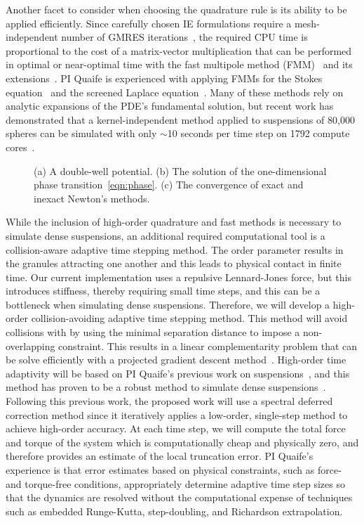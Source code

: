 Another facet to consider when choosing the quadrature rule is its
ability to be applied efficiently. Since carefully chosen IE
formulations require a mesh-independent number of GMRES
iterations~\cite{cam-ips-kel-mey-xue1996}, the required CPU time is
proportional to the cost of a matrix-vector multiplication that can be
performed in optimal or near-optimal time with the fast multipole method
(FMM)~\cite{fmm5} and its extensions~\cite{fmm1, fmm2, fmm3, fmm4, fmm6,
fmm7, ros-ols2016}. PI Quaife is experienced with applying FMMs for the
Stokes equation~\cite{qua-bir2014, bys-sha-qua2020} and the screened
Laplace equation~\cite{kro-qua2011, qua2011}. Many of these methods rely
on analytic expansions of the PDE's fundamental solution, but recent
work has demonstrated that a kernel-independent method applied to
suspensions of 80,000 spheres can be simulated with only $\sim$10
seconds per time step on 1792 compute cores~\cite{Yan2019}.

\begin{figure}
  \vspace{-8pt}
  \centering
   
  \caption{\label{fig:CA} \footnotesize (a) A double-well potential. (b)
  The solution of the one-dimensional phase
  transition~\eqref{eqn:phase}. (c) The convergence of exact and inexact
  Newton's methods.}
\end{figure}
While the inclusion of high-order quadrature and fast methods is
necessary to simulate dense suspensions, an additional required
computational tool is a collision-aware adaptive time stepping method.
The order parameter results in the granules attracting one another and
this leads to physical contact in finite time. Our current
implementation uses a repulsive Lennard-Jones force, but this introduces
stiffness, thereby requiring small time steps, and this can be a
bottleneck when simulating dense suspensions. Therefore, we will develop
a high-order collision-avoiding adaptive time stepping method. This
method will avoid collisions with by using the minimal separation
distance to impose a non-overlapping constraint. This results in a
linear complementarity problem that can be solve efficiently with a
projected gradient descent method~\cite{Yan2019}. High-order time
adaptivity will be based on PI Quaife's previous work on
suspensions~\cite{qua-bir2016}, and this method has proven to be a
robust method to simulate dense suspensions~\cite{qua-vee-you2019,
kab-qua-bir2017, qua-gan-you2021}. Following this previous work, the
proposed work will use a spectral deferred correction method since it
iteratively applies a low-order, single-step method to achieve
high-order accuracy. At each time step, we will compute the total force
and torque of the system which is computationally cheap and physically
zero, and therefore provides an estimate of the local truncation error.
PI Quaife's experience is that error estimates based on physical
constraints, such as force- and torque-free conditions, appropriately
determine adaptive time step sizes so that the dynamics are resolved
without the computational expense of techniques such as embedded
Runge-Kutta, step-doubling, and Richardson extrapolation.

